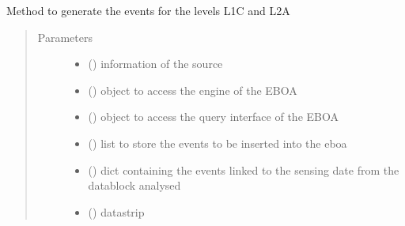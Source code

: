 \begin{fulllineitems}
\label{\detokenize{s2boa.ingestions:s2boa.ingestions.functions.L1C_L2A_processing}}
\sphinxAtStartPar
Method to generate the events for the levels L1C and L2A
\begin{quote}\begin{description}
\item[{Parameters}] \leavevmode\begin{itemize}
\item {} 
\sphinxAtStartPar
{} () \textendash{} information of the source

\item {} 
\sphinxAtStartPar
{} () \textendash{} object to access the engine of the EBOA

\item {} 
\sphinxAtStartPar
{} () \textendash{} object to access the query interface of the EBOA

\item {} 
\sphinxAtStartPar
{} () \textendash{} list to store the events to be inserted into the eboa

\item {} 
\sphinxAtStartPar
{} () \textendash{} dict containing the events linked to the sensing date from the datablock analysed

\item {} 
\sphinxAtStartPar
{} () \textendash{} datastrip


\end{itemize}
\end{description}
\end{quote}
\end{fulllineitems}
